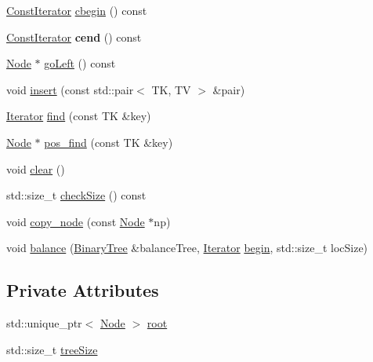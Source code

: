 \begin{DoxyCompactItemize}
\item 
\mbox{\hyperlink{classBinaryTree_1_1ConstIterator}{Const\+Iterator}} \mbox{\hyperlink{classBinaryTree_a70ad506f00c666f7e3b26f78e66709c7}{cbegin}} () const
\item 
\mbox{\label{classBinaryTree_a9557ea5e5b15a398aaa390313a73be44}} 
\mbox{\hyperlink{classBinaryTree_1_1ConstIterator}{Const\+Iterator}} {\bfseries cend} () const
\item 
\mbox{\hyperlink{structBinaryTree_1_1Node}{Node}} $\ast$ \mbox{\hyperlink{classBinaryTree_a5b7168f283acc83b39e5af15b9817b47}{go\+Left}} () const
\item 
void \mbox{\hyperlink{classBinaryTree_a2e953ad45f601f1e94dbdb85c67f0bbb}{insert}} (const std\+::pair$<$ TK, TV $>$ \&pair)
\item 
\mbox{\hyperlink{classBinaryTree_1_1Iterator}{Iterator}} \mbox{\hyperlink{classBinaryTree_ae515b4f35af1e4f44a688cb8698471c8}{find}} (const TK \&key)
\item 
\mbox{\hyperlink{structBinaryTree_1_1Node}{Node}} $\ast$ \mbox{\hyperlink{classBinaryTree_a0a237f399143c32083d44623effa97ae}{pos\+\_\+find}} (const TK \&key)
\item 
void \mbox{\hyperlink{classBinaryTree_a264446922f6d5fe75d4a41c650f88d6a}{clear}} ()
\item 
std\+::size\+\_\+t \mbox{\hyperlink{classBinaryTree_a8e35d6be680d9fbd5129361337ada338}{check\+Size}} () const
\item 
void \mbox{\hyperlink{classBinaryTree_a01dfd4a677465fbc20923794e2363b44}{copy\+\_\+node}} (const \mbox{\hyperlink{structBinaryTree_1_1Node}{Node}} $\ast$np)
\item 
void \mbox{\hyperlink{classBinaryTree_a1c3972b0a02afa3c6c35dcad6b8440c5}{balance}} (\mbox{\hyperlink{classBinaryTree}{Binary\+Tree}} \&balance\+Tree, \mbox{\hyperlink{classBinaryTree_1_1Iterator}{Iterator}} \mbox{\hyperlink{classBinaryTree_a828acf65e70cf4b6e106807a052ca508}{begin}}, std\+::size\+\_\+t loc\+Size)
\end{DoxyCompactItemize}
\subsection*{Private Attributes}
\begin{DoxyCompactItemize}
\item 
std\+::unique\+\_\+ptr$<$ \mbox{\hyperlink{structBinaryTree_1_1Node}{Node}} $>$ \mbox{\hyperlink{classBinaryTree_a787363fcf3a4109694808f03b3793614}{root}}
\item 
std\+::size\+\_\+t \mbox{\hyperlink{classBinaryTree_a95c64190503d0c8f5f7878bfb4aaf841}{tree\+Size}}
\end{DoxyCompactItemize}
